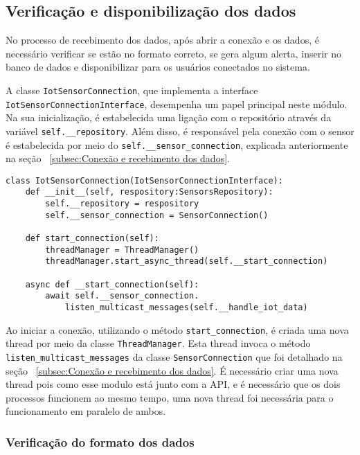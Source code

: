 \subsection[Verificação e disponibilização dos dados]{Verificação e disponibilização dos dados}\label{subsec:checkDataReceived}
No processo de recebimento dos dados, após abrir a conexão e os dados, é necessário verificar se estão no formato correto, se gera algum alerta, inserir no banco de dados e disponibilizar para os usuários conectados no sistema.

A classe \texttt{IotSensorConnection}, que implementa a interface \texttt{IotSensorConnectionInterface}, desempenha um papel principal neste módulo. Na sua inicialização, é estabelecida uma ligação com o repositório através da variável \texttt{self.\_\_repository}. Além disso, é responsável pela conexão com o sensor é estabelecida por meio do \texttt{self.\_\_sensor\_connection}, explicada anteriormente na seção ~\ref{subsec:Conexão e recebimento dos dados}.

\begin{verbatim}
class IotSensorConnection(IotSensorConnectionInterface):
    def __init__(self, respository:SensorsRepository):
        self.__repository = respository
        self.__sensor_connection = SensorConnection()
    
    def start_connection(self):
        threadManager = ThreadManager()
        threadManager.start_async_thread(self.__start_connection)
    
    async def __start_connection(self):
        await self.__sensor_connection.
            listen_multicast_messages(self.__handle_iot_data)
\end{verbatim}

Ao iniciar a conexão, utilizando o método \texttt{start\_connection}, é criada uma nova thread por meio da classe \texttt{ThreadManager}. Esta thread invoca o método \texttt{listen\_multicast\_messages} da classe \texttt{SensorConnection} que foi detalhado na seção ~\ref{subsec:Conexão e recebimento dos dados}. É necessário criar uma nova thread pois como esse modulo está junto com a API, e é necessário que os dois processos funcionem ao mesmo tempo, uma nova thread foi necessária para o funcionamento em paralelo de ambos.

\subsubsection{Verificação do formato dos dados}

